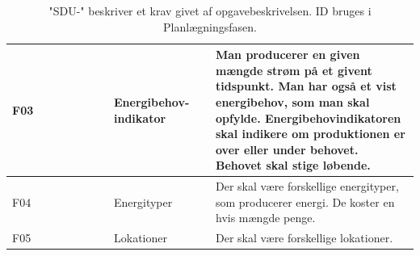 \documentclass[a4paper,12pt]{report}
\begin{document}
\begin{table}[H]
\begin{tabular}{|p{0.25\linewidth}|p{0.25\linewidth}||p{0.5\linewidth}|}
F03                   & Energibehov-indikator           & Man producerer en given mængde strøm på et givent tidspunkt. Man har også et vist energibehov, som man skal opfylde. Energibehovindikatoren skal indikere om produktionen er over eller under behovet. Behovet skal stige løbende.                                                       \\ \hline
F04                   & Energityper                    & Der skal være forskellige energityper, som producerer energi. De koster en hvis mængde penge.                                                                                                                                                                                            \\ \hline
F05                   & Lokationer                     & Der skal være forskellige lokationer.                                                                                                                                                                                                                                                    \\ \hline
\end{tabular}
\caption{"SDU-" beskriver et krav givet af opgavebeskrivelsen. ID bruges i Planlægningsfasen.}
\label{tab:fkrav}
\end{table}
\end{document}
